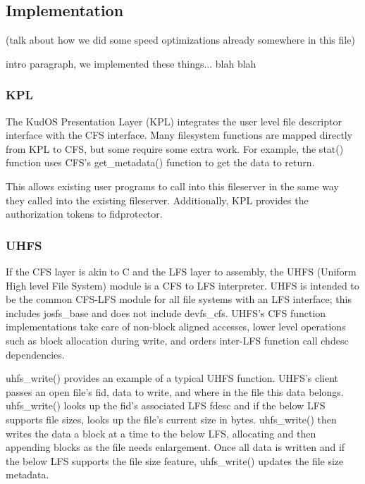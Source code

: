 \subsection{Implementation}
\label{sec:solution:impl}

(talk about how we did some speed optimizations already somewhere in this file)

intro paragraph, we implemented these things... blah blah

\subsubsection{KPL}

The KudOS Presentation Layer (KPL) integrates the user level file
descriptor interface with the CFS interface. Many filesystem functions
are mapped directly from KPL to CFS, but some require some extra
work. For example, the stat() function uses CFS's get\_metadata()
function to get the data to return.

This allows existing user programs to call into this fileserver in the
same way they called into the existing fileserver. Additionally, KPL
provides the authorization tokens to fidprotector.

\subsubsection{UHFS}
\label{sec:solution:impl:uhfs}

If the CFS layer is akin to C and the LFS layer to assembly, the UHFS (Uniform
High level File System) module is a CFS to LFS interpreter. UHFS is intended to
be the common CFS-LFS module for all file systems with an LFS interface; this
includes josfs\_base and does not include devfs\_cfs. UHFS's CFS function
implementations take care of non-block aligned accesses, lower level operations
such as block allocation during write, and orders inter-LFS function call chdesc
dependencies.

uhfs\_write() provides an example of a typical UHFS function. UHFS's client
passes an open file's fid, data to write, and where in the file this data
belongs. uhfs\_write() looks up the fid's associated LFS fdesc and if the below
LFS supports file sizes, looks up the file's current size in bytes.
uhfs\_write() then writes the data a block at a time to the below LFS,
allocating and then appending blocks as the file needs enlargement. Once all
data is written and if the below LFS supports the file size feature,
uhfs\_write() updates the file size metadata.

